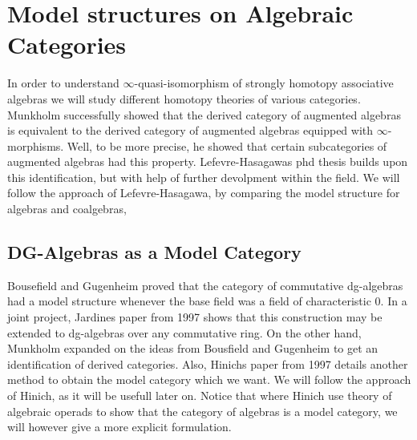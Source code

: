 \documentclass[../thesis.tex]{subfiles}
\begin{document}
    \section{Model structures on Algebraic Categories}

            In order to understand $\infty$-quasi-isomorphism of strongly homotopy associative algebras we will study different homotopy theories of various categories. Munkholm \cite{Munkholm78} successfully showed that the derived category of augmented algebras is equivalent to the derived category of augmented algebras equipped with $\infty$-morphisms. Well, to be more precise, he showed that certain subcategories of augmented algebras had this property. Lefevre-Hasagawas phd thesis \cite{LefevreHasegawa03} builds upon this identification, but with help of further devolpment within the field. We will follow the approach of Lefevre-Hasagawa, by comparing the model structure for algebras and coalgebras,

        \subsection{DG-Algebras as a Model Category}

            Bousefield and Gugenheim \cite{Bousfield76} proved that the category of commutative dg-algebras had a model structure whenever the base field was a field of characteristic $0$. In a joint project, Jardines paper from 1997 \cite{Jardine97} shows that this construction may be extended to dg-algebras over any commutative ring. On the other hand, Munkholm expanded on the ideas from Bousfield and Gugenheim to get an identification of derived categories. Also, Hinichs paper from 1997 \cite{Hinich97} details another method to obtain the model category which we want. We will follow the approach of Hinich, as it will be usefull later on. Notice that where Hinich use theory of algebraic operads to show that the category of algebras is a model category, we will however give a more explicit formulation.
\end{document}
